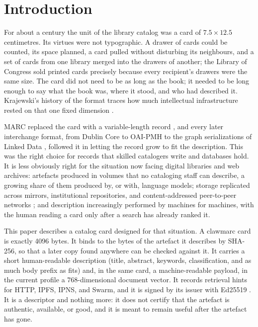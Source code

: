 \documentclass[sigconf]{acmart}
\begin{document}
\maketitle

\section{Introduction}

For about a century the unit of the library catalog was a card of
$7.5 \times 12.5$ centimetres. Its virtues were not typographic. A drawer of
cards could be counted, its space planned, a card pulled without disturbing its
neighbours, and a set of cards from one library merged into the drawers of
another; the Library of Congress sold printed cards precisely because every
recipient's drawers were the same size. The card did not need to be as long as
the book; it needed to be long enough to say what the book was, where it stood,
and who had described it. Krajewski's history of the format traces how much
intellectual infrastructure rested on that one fixed dimension
\cite{Krajewski:2011}.

MARC replaced the card with a variable-length record \cite{Avram:1975}, and
every later interchange format, from Dublin Core \cite{Kunze:2007} to OAI-PMH
\cite{Lagoze:2001} to the graph serializations of Linked Data
\cite{Kellogg:2020}, followed it in letting the record grow to fit the
description. This was the right choice for records that skilled catalogers
write and databases hold. It is less obviously right for the situation now
facing digital libraries and web archives: artefacts produced in volumes that
no cataloging staff can describe, a growing share of them produced by, or with,
language models; storage replicated across mirrors, institutional
repositories, and content-addressed peer-to-peer networks
\cite{Benet:2014,Alam:2016}; and description increasingly performed by machines
for machines, with the human reading a card only after a search has already
ranked it.

This paper describes a catalog card designed for that situation. A clawmarc
card is exactly 4096 bytes. It binds to the bytes of the artefact it describes
by SHA-256, so that a later copy found anywhere can be checked against it. It
carries a short human-readable description (title, abstract, keywords,
classification, and as much body prefix as fits) and, in the same card, a
machine-readable payload, in the current profile a 768-dimensional document
vector. It records retrieval hints for HTTP, IPFS, IPNS, and Swarm, and it is
signed by its issuer with Ed25519 \cite{Josefsson:2017}. It is a descriptor and
nothing more: it does not certify that the artefact is authentic, available, or
good, and it is meant to remain useful after the artefact has gone.
\end{document}
